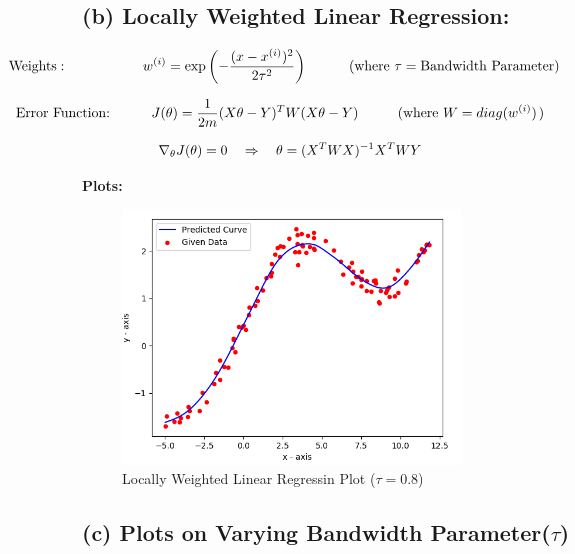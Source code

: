 \documentclass[a4 paper]{article}
\begin{document}
\subsection*{(b) Locally Weighted Linear Regression:}
\vspace*{0.3cm}
$$ \hspace*{-2.5cm}\text{Weights}: \hspace*{1.9cm} w^{(i)} = \exp\left(-\frac{(x-x^{(i)})^2}{2\tau^2}\right) \quad \quad \quad (\text{where } \tau = \text{Bandwidth Parameter}) $$

$$ \hspace*{-2.7cm} \text{Error Function: } \hspace*{0.9cm} J(\theta) = \frac{1}{2m} (X\theta - Y)^TW(X\theta - Y) \hspace*{1cm} (\text{where } W = diag(w^{(i)}) \hspace*{0.5mm}) $$


$$ \hspace*{-5.8cm} \text{Minima:} \hspace*{2.3cm} \nabla_{\theta}J(\theta) = 0 \quad \Rightarrow \quad \theta = (X^TWX)^{-1}X^TWY $$

\newpage
\hspace*{-0.2cm}
\textbf{Plots:}

\begin{figure}[!htb]
	\centering
	\includegraphics[width = 90mm]{./Plots/2b(08).png}
	\caption{Locally Weighted Linear Regressin Plot ($\tau = 0.8$)}
  	\label{fig2}
\end{figure}

\vspace*{-0.5cm}
\subsection*{(c) Plots on Varying Bandwidth Parameter($\tau$)}
\end{document}
